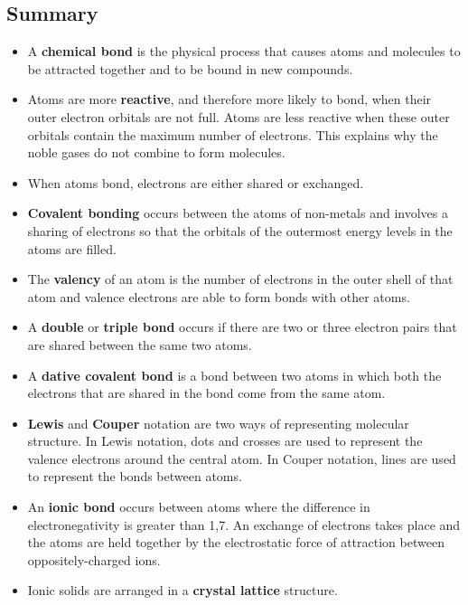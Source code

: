             \subsection{ Summary}
            \nopagebreak
      \label{m38689*id147386}\begin{itemize}[noitemsep]
            \label{m38689*uid136}\item A \textbf{chemical bond} is the physical process that causes atoms and molecules to be attracted together and to be bound in new compounds.
\label{m38689*uid137}\item Atoms are more \textbf{reactive}, and therefore more likely to bond, when their outer electron orbitals are not full. Atoms are less reactive when these outer orbitals contain the maximum number of electrons. This explains why the noble gases do not combine to form molecules.
\label{m38689*uid142}\item When atoms bond, electrons are either shared or exchanged.
\label{m38689*uid143}\item \textbf{Covalent bonding} occurs between the atoms of non-metals and involves a sharing of electrons so that the orbitals of the outermost energy levels in the atoms are filled.
\label{m38689*uid144}\item The \textbf{valency} of an atom is the number of electrons in the outer shell of that atom and valence electrons are able to form bonds with other atoms.
\label{m38689*uid145}\item A \textbf{double} or \textbf{triple bond} occurs if there are two or three electron pairs that are shared between the same two atoms.
\label{m38689*uid146}\item A \textbf{dative covalent bond} is a bond between two atoms in which both the electrons that are shared in the bond come from the same atom.
\label{m38689*uid147}\item \textbf{Lewis} and \textbf{Couper} notation are two ways of representing molecular structure. In Lewis notation, dots and crosses are used to represent the valence electrons around the central atom. In Couper notation, lines are used to represent the bonds between atoms.
\label{m38689*uid150}\item An \textbf{ionic bond} occurs between atoms where the difference in electronegativity is greater than 1,7. An exchange of electrons takes place and the atoms are held together by the electrostatic force of attraction between oppositely-charged ions.
\label{m38689*uid151}\item Ionic solids are arranged in a \textbf{crystal lattice} structure.

\end{itemize}
